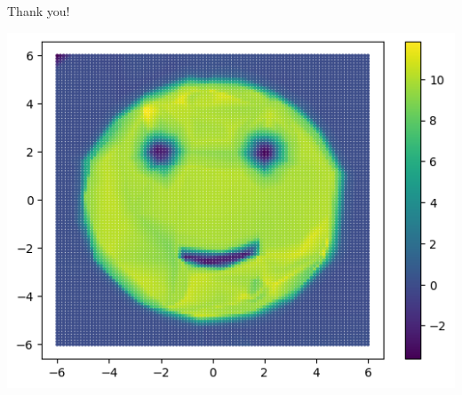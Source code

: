 \documentclass[]{SangerLibrary/sanger-present}
\begin{document}
	\begin{frame}{Thank you!}
		
		\begin{center}
			\includegraphics[width=0.8\paperwidth,height=0.8\paperheight,keepaspectratio=true]{smile.png}
		\end{center}
	\end{frame}
\end{document}
